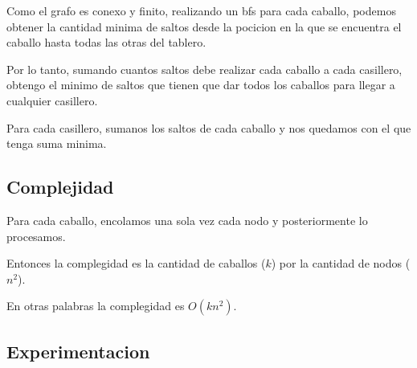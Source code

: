 Como el grafo es conexo y finito, realizando un bfs para cada caballo, podemos obtener la cantidad minima de saltos desde la pocicion en la que se encuentra el caballo hasta todas las otras del tablero.

Por lo tanto, sumando cuantos saltos debe realizar cada caballo a cada casillero, obtengo el minimo de saltos que tienen que dar todos los caballos para llegar a cualquier casillero.

Para cada casillero, sumanos los saltos de cada caballo y nos quedamos con el que tenga suma minima.

\subsection{Complejidad}
Para cada caballo, encolamos una sola vez cada nodo y posteriormente lo procesamos.

Entonces la complegidad es la cantidad de caballos ($k$) por la cantidad de nodos ($n^2$).

En otras palabras la complegidad es $O(kn^2)$.

\subsection{Experimentacion}
